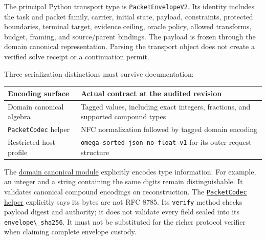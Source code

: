 \documentclass[
  11pt,
]{article}
\newcommand{\passthrough}[1]{#1}
\begin{document}
The principal Python transport type is
\href{https://github.com/dbccpage/the_symbol_game/blob/52cb5457f6c485ba548cfd292f6012a941ed22cf/omega_engine_symbol_game/domain/entities/packet_envelope.py}{\passthrough{\lstinline!PacketEnvelopeV2!}}.
Its identity includes the task and packet family, carrier, initial
state, payload, constraints, protected boundaries, terminal target,
evidence ceiling, oracle policy, allowed transforms, budget, framing,
and source/parent bindings. The payload is frozen through the domain
canonical representation. Parsing the transport object does not create a
verified solve receipt or a continuation permit.

Three serialization distinctions must survive documentation:

\begin{longtable}[]{@{}
  >{\raggedright\arraybackslash}p{}
  >{\raggedright\arraybackslash}p{}@{}}
\toprule\noalign{}
\begin{minipage}[b]{\linewidth}\raggedright
Encoding surface
\end{minipage} & \begin{minipage}[b]{\linewidth}\raggedright
Actual contract at the audited revision
\end{minipage} \\
\midrule\noalign{}
\endhead
\bottomrule\noalign{}
\endlastfoot
Domain canonical algebra & Tagged values, including exact integers,
fractions, and supported compound types \\
\passthrough{\lstinline!PacketCodec!} helper & NFC normalization
followed by tagged domain encoding \\
Restricted host profile &
\passthrough{\lstinline!omega-sorted-json-no-float-v1!} for its outer
request structure \\
\end{longtable}

The
\href{https://github.com/dbccpage/the_symbol_game/blob/52cb5457f6c485ba548cfd292f6012a941ed22cf/omega_engine_symbol_game/domain/shared_kernel/canonical.py}{domain
canonical module} explicitly encodes type information. For example, an
integer and a string containing the same digits remain distinguishable.
It validates canonical compound encodings on reconstruction. The
\href{https://github.com/dbccpage/the_symbol_game/blob/52cb5457f6c485ba548cfd292f6012a941ed22cf/omega_engine_symbol_game/domain/packet_codec.py}{\passthrough{\lstinline!PacketCodec!}
helper} explicitly says its bytes are not RFC 8785. Its
\passthrough{\lstinline!verify!} method checks payload digest and
authority; it does not validate every field sealed into its
\passthrough{\lstinline!envelope\_sha256!}. It must not be substituted
for the richer protocol verifier when claiming complete envelope
custody.
\end{document}
